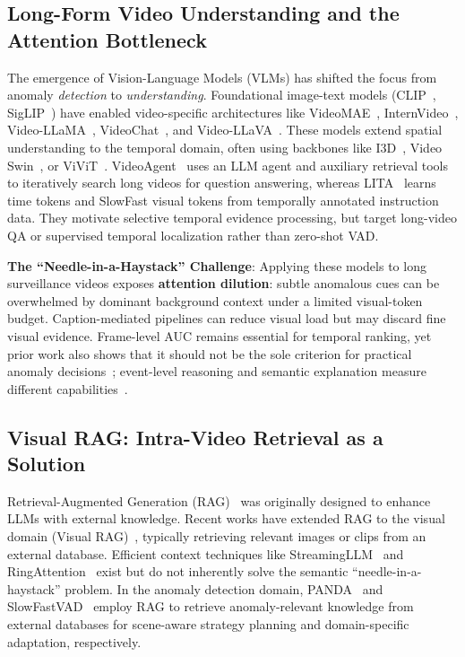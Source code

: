 \subsection{Long-Form Video Understanding and the Attention Bottleneck}

The emergence of Vision-Language Models (VLMs) has shifted the focus from anomaly \emph{detection} to \emph{understanding}.
Foundational image-text models (CLIP~\cite{radford2021learning}, SigLIP~\cite{zhai2023sigmoid}) have enabled video-specific architectures like VideoMAE~\cite{tong2022videomae}, InternVideo~\cite{wang2022internvideo}, Video-LLaMA~\cite{zhang2023video}, VideoChat~\cite{li2025videochat}, and Video-LLaVA~\cite{lin2024video}. These models extend spatial understanding to the temporal domain, often using backbones like I3D~\cite{carreira2017quo}, Video Swin~\cite{liu2022video}, or ViViT~\cite{arnab2021vivit}. VideoAgent~\cite{wang2024videoagent} uses an LLM agent and auxiliary retrieval tools to iteratively search long videos for question answering, whereas LITA~\cite{huang2024lita} learns time tokens and SlowFast visual tokens from temporally annotated instruction data. They motivate selective temporal evidence processing, but target long-video QA or supervised temporal localization rather than zero-shot VAD.

\textbf{The ``Needle-in-a-Haystack'' Challenge}: Applying these models to long surveillance videos exposes \textbf{attention dilution}: subtle anomalous cues can be overwhelmed by dominant background context under a limited visual-token budget. Caption-mediated pipelines can reduce visual load but may discard fine visual evidence. Frame-level AUC remains essential for temporal ranking, yet prior work also shows that it should not be the sole criterion for practical anomaly decisions~\cite{doshi2022rethinking,zhang2024holmes,pi2024vader}; event-level reasoning and semantic explanation measure different capabilities~\cite{chen2025ucvl}.

\subsection{Visual RAG: Intra-Video Retrieval as a Solution}

Retrieval-Augmented Generation (RAG)~\cite{lewis2020retrieval} was originally designed to enhance LLMs with external knowledge. Recent works have extended RAG to the visual domain (Visual RAG)~\cite{chen2022murag,caffagni2024wiki,yasunaga2022retrieval,hu2023reveal}, typically retrieving relevant images or clips from an external database. Efficient context techniques like StreamingLLM~\cite{xiao2023efficient} and RingAttention~\cite{liu2023ring} exist but do not inherently solve the semantic ``needle-in-a-haystack'' problem.
In the anomaly detection domain, PANDA~\cite{yang2025panda} and SlowFastVAD~\cite{ding2025slowfastvad} employ RAG to retrieve anomaly-relevant knowledge from external databases for scene-aware strategy planning and domain-specific adaptation, respectively.

